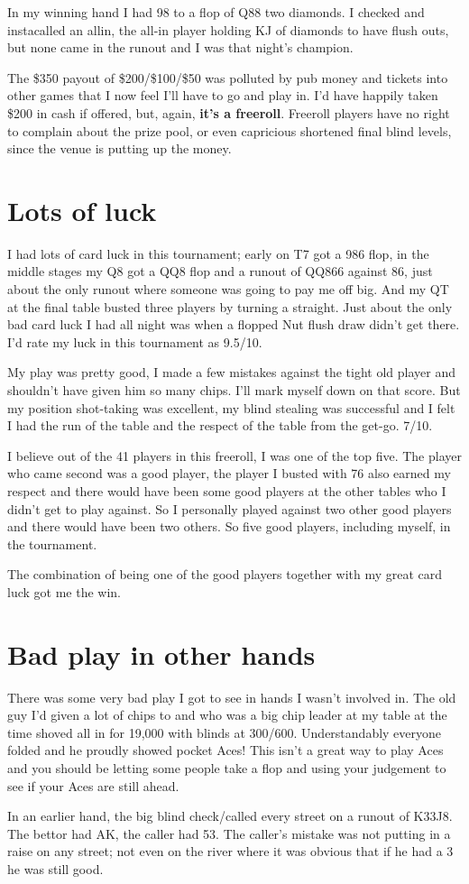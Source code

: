 In my winning hand I had 98 to a flop of Q88 two diamonds.
I checked and instacalled an allin, the all-in player holding
KJ of diamonds to have flush outs, but none came in the runout
and I was that night's champion.

The \$350 payout of \$200/\$100/\$50 was polluted by
pub money and tickets into other games that I now feel
I'll have to go and play in. I'd have happily taken
\$200 in cash if offered, but, again, \textbf{it's a freeroll}.
Freeroll players have no right to complain about the prize pool,
or even capricious shortened final blind levels, since the
venue is putting up the money.

\section{Lots of luck}

I had lots of card luck in this tournament; early on T7 got a 986 flop,
in the middle stages my Q8 got a QQ8 flop and a runout of QQ866 against
86, just about the only runout where someone was going to pay me off big.
And my QT at the final table busted three players by turning a straight.
Just about the only bad card luck I had all night was when a flopped
Nut flush draw didn't get there. I'd rate my luck in this tournament
as 9.5/10.

My play was pretty good, I made a few mistakes against the tight old
player and shouldn't have given him so many chips. I'll mark myself
down on that score. But my position shot-taking was excellent, my blind
stealing was successful and I felt I had the run of the table and
the respect of the table from the get-go. 7/10.

I believe out of the 41 players in this freeroll, I was one of
the top five. The player who came second was a good player, the player
I busted with 76 also earned my respect and there would have been
some good players at the other tables who I didn't get to play
against. So I personally played against two other good players
and there would have been two others. So five good players,
including myself, in the tournament.

The combination of being one of the good players together
with my great card luck got me the win.

\section{Bad play in other hands}

There was some very bad play I got to see in hands I wasn't involved in.
The old guy I'd given a lot of chips to and who was a big chip leader
at my table at the time shoved all in for 19,000 with blinds at 300/600.
Understandably everyone folded and he proudly showed pocket Aces! This
isn't a great way to play Aces and you should be letting some people
take a flop and using your judgement to see if your Aces are still ahead.

In an earlier hand, the big blind check/called every street on a runout
of K33J8. The bettor had AK, the caller had 53. The caller's mistake was
not putting in a raise on any street; not even on the river where it
was obvious that if he had a 3 he was still good.
